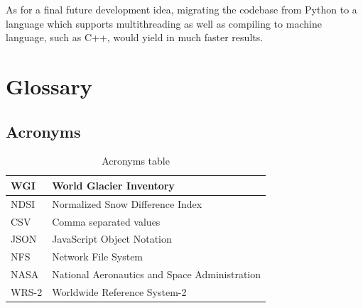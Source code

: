\documentclass[12pt, a4paper]{report}
\begin{document}
	\par As for a final future development idea, migrating the codebase from Python to a language which supports multithreading as well as compiling to machine language, such as C++, would yield in much faster results. 

	
	\newpage{}
	\chapter{Glossary}
	
	
	\section{Acronyms}
	
		\begin{table} [H]
		\centering
		\begin{tabular} {|  l | L{10cm} |}
			\hline
			WGI & World Glacier Inventory \\ [0.2ex]
			\hline
			NDSI & Normalized Snow Difference Index \\ [0.2ex]
			\hline
			CSV & Comma separated values \\ [0.2ex]
			\hline
			JSON & JavaScript Object Notation \\ [0.2ex]
			\hline
			NFS & Network File System \\ [0.2ex]
			\hline
			NASA & National Aeronautics and Space Administration \\ [0.2ex]
			\hline
			WRS-2 & Worldwide Reference System-2 \\ [0.2ex]
			\hline
		\end{tabular}
		\caption{Acronyms table }
		\label{table:acron}
	\end{table}

	
	

	
\end{document}
